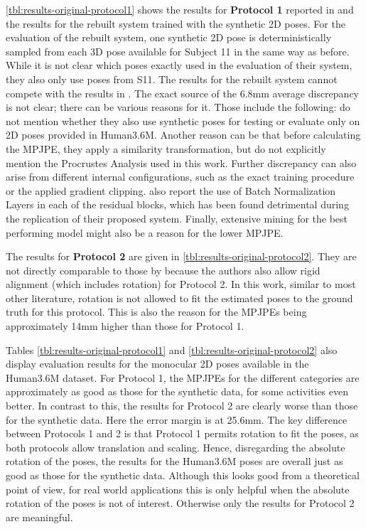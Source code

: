 \autoref{tbl:results-original-protocol1} shows the results for \textbf{Protocol 1} reported in \cite{drover18} and the results for the rebuilt system trained with the synthetic 2D poses.
For the evaluation of the rebuilt system, one synthetic 2D pose is deterministically sampled from each 3D pose available for Subject 11 in the same way as before.
While it is not clear which poses \citet{drover18} exactly used in the evaluation of their system, they also only use poses from S11.
The results for the rebuilt system cannot compete with the results in \cite{drover18}.
The exact source of the 6.8mm average discrepancy is not clear; there can be various reasons for it.
Those include the following:
\citet{drover18} do not mention whether they also use synthetic poses for testing or evaluate only on 2D poses provided in Human3.6M.
Another reason can be that before calculating the MPJPE, they apply a similarity transformation, but do not explicitly mention the Procrustes Analysis used in this work.
Further discrepancy can also arise from different internal configurations, such as the exact training procedure or the applied gradient clipping.
\citet{drover18} also report the use of Batch Normalization Layers in each of the residual blocks, which has been found detrimental during the replication of their proposed system.
Finally, extensive mining for the best performing model might also be a reason for the lower MPJPE.

The results for \textbf{Protocol 2} are given in \autoref{tbl:results-original-protocol2}.
They are not directly comparable to those by \citet{drover18} because the authors also allow rigid alignment (which includes rotation) for Protocol 2.
In this work, similar to most other literature, rotation is not allowed to fit the estimated poses to the ground truth for this protocol.
This is also the reason for the MPJPEs being approximately 14mm higher than those for Protocol 1.

Tables \ref{tbl:results-original-protocol1} and \ref{tbl:results-original-protocol2} also display evaluation results for the monocular 2D poses available in the Human3.6M dataset.
For Protocol 1, the MPJPEs for the different categories are approximately as good as those for the synthetic data, for some activities even better.
In contrast to this, the results for Protocol 2 are clearly worse than those for the synthetic data.
Here the error margin is at 25.6mm.
The key difference between Protocols 1 and 2 is that Protocol 1 permits rotation to fit the poses, as both protocols allow translation and scaling.
Hence, disregarding the absolute rotation of the poses, the results for the Human3.6M poses are overall just as good as those for the synthetic data.
Although this looks good from a theoretical point of view, for real world applications this is only helpful when the absolute rotation of the poses is not of interest.
Otherwise only the results for Protocol 2 are meaningful.

